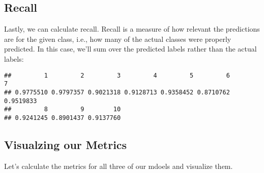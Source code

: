 \documentclass[]{book}
\newenvironment{Shaded}{\begin{snugshade}}{\end{snugshade}}
\newcommand{\KeywordTok}[1]{\textcolor[rgb]{0.13,0.29,0.53}{\textbf{#1}}}
\newcommand{\DecValTok}[1]{\textcolor[rgb]{0.00,0.00,0.81}{#1}}
\newcommand{\StringTok}[1]{\textcolor[rgb]{0.31,0.60,0.02}{#1}}
\newcommand{\ControlFlowTok}[1]{\textcolor[rgb]{0.13,0.29,0.53}{\textbf{#1}}}
\newcommand{\OperatorTok}[1]{\textcolor[rgb]{0.81,0.36,0.00}{\textbf{#1}}}
\newcommand{\NormalTok}[1]{#1}
\theoremstyle{definition}
\theoremstyle{definition}
\theoremstyle{definition}
\theoremstyle{remark}
\begin{document}
\subsection{Recall}\label{recall}

Lastly, we can calculate recall. Recall is a measure of how relevant the
predictions are for the given class, i.e., how many of the actual
classes were properly predicted. In this case, we'll sum over the
predicted labels rather than the actual labels:

\begin{Shaded}
\end{Shaded}

\begin{verbatim}
##         1         2         3         4         5         6         7 
## 0.9775510 0.9797357 0.9021318 0.9128713 0.9358452 0.8710762 0.9519833 
##         8         9        10 
## 0.9241245 0.8901437 0.9137760
\end{verbatim}

\subsection{Visualzing our Metrics}\label{visualzing-our-metrics}

Let's calculate the metrics for all three of our mdoels and visualize
them.
\end{document}
